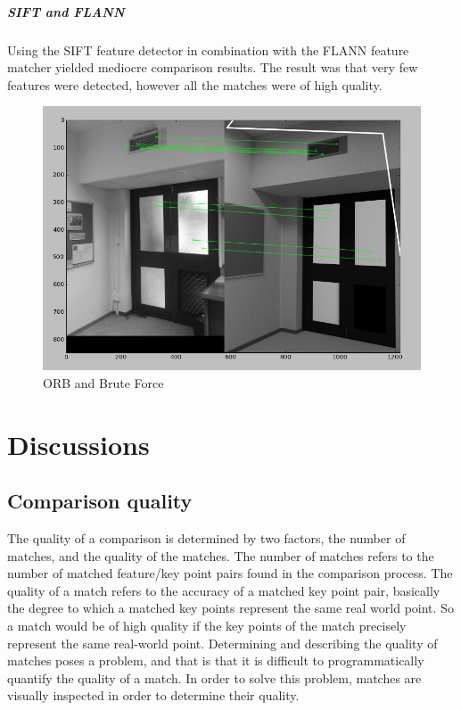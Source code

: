 \documentclass[11pt,a4paper]{report}
\begin{document}
				\paragraph{SIFT and FLANN}
					Using the SIFT feature detector in combination with the FLANN feature matcher yielded mediocre comparison results. The result was that very few features were detected, however all the matches were of high quality.
					\begin{figure}[H]
						\centering
						\includegraphics[width=1\textwidth]{sift_and_flann_results}
						\caption{ORB and Brute Force}
						\label{fig:sift_and_flann_results}
					\end{figure}

\chapter{Discussions}
	\section{Comparison quality}
		The quality of a comparison is determined by two factors, the number of matches, and the quality of the matches. The number of matches refers to the number of matched feature/key point pairs found in the comparison process. The quality of a match refers to the accuracy of a matched key point pair, basically the degree to which a matched key points represent the same real world point. So a match would be of high quality if the key points of the match precisely represent the same real-world point.
		Determining and describing the quality of matches poses a problem, and that is that it is difficult to programmatically quantify the quality of a match. In order to solve this problem, matches are visually inspected in order to determine their quality.
\end{document}
